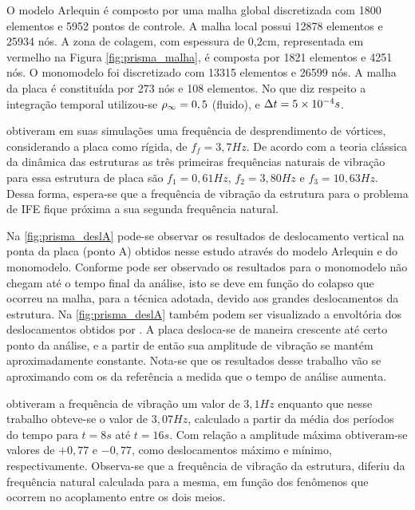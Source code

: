 O modelo Arlequin é composto por uma malha global discretizada com 1800 elementos e 5952 pontos de controle. A malha local possui 12878 elementos e 25934 nós. A zona de colagem, com espessura de 0,2cm, representada em vermelho na Figura \ref{fig:prisma_malha}, é composta por 1821 elementos e 4251 nós.  O monomodelo foi discretizado com 13315 elementos e 26599 nós. A malha da placa é constituída por 273 nós e 108 elementos. No que diz respeito a integração temporal utilizou-se  $\rho_\infty = 0,5$ (fluido), e $\Delta t = 5\times10^{-4}s$.

 obtiveram em suas simulações uma frequência de desprendimento de vórtices, considerando a placa como rígida, de $f_f = 3,7Hz$. De acordo com a teoria clássica da dinâmica das estruturas as três primeiras frequências naturais de vibração para essa estrutura de placa são $f_1 = 0,61Hz$, $f_2 = 3,80Hz$ e $f_3 = 10,63Hz$. Dessa forma, espera-se que a frequência de vibração da estrutura para o problema de IFE fique próxima a sua segunda frequência natural.

Na \autoref{fig:prisma_deslA} pode-se observar os resultados de deslocamento vertical na ponta da placa (ponto A) obtidos nesse estudo através do modelo Arlequin e do monomodelo. Conforme pode ser observado os resultados para o monomodelo não chegam até o tempo final da análise, isto se deve em função do colapso que ocorreu na malha, para a técnica adotada, devido aos grandes deslocamentos da estrutura. Na \autoref{fig:prisma_deslA} também podem ser visualizado a envoltória dos deslocamentos obtidos por . A placa desloca-se de maneira crescente até certo ponto da análise, e a partir de então sua amplitude de vibração se mantém aproximadamente constante. Nota-se que os resultados desse trabalho vão se aproximando com os da referência a medida que o tempo de análise aumenta. 
 
 obtiveram a frequência de vibração um valor de $3,1Hz$ enquanto que nesse trabalho obteve-se o valor de $3,07Hz$, calculado a partir da média dos períodos do tempo para $t=8s$ até $t=16s$. Com relação a amplitude máxima obtiveram-se valores de $+0,77$ e $-0,77$, como deslocamentos máximo e mínimo, respectivamente. Observa-se que a frequência de vibração da estrutura, diferiu da frequência natural calculada para a mesma, em função dos fenômenos que ocorrem no acoplamento entre os dois meios.

